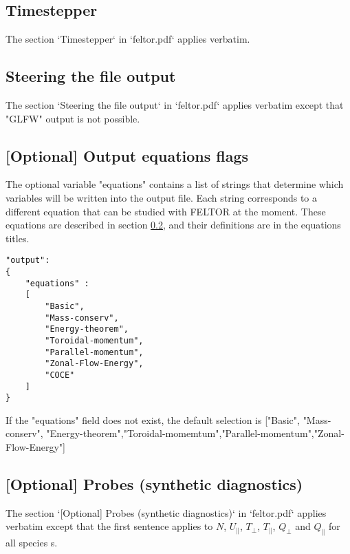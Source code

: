\subsection{Timestepper}
The section `Timestepper` in `feltor.pdf` applies verbatim.

\subsection{Steering the file output} \label{sec:output}
The section `Steering the file output` in `feltor.pdf` applies verbatim except
that "GLFW" output is not possible.


\subsection{[Optional] Output equations flags}\label{sec:output_flags}
The optional variable "equations" contains a list of strings that
determine which variables will be written into the output file.
Each string
corresponds to a different equation that can be studied with FELTOR at the
moment. These equations are described in section \ref{sec:output}, and their
definitions are in the equations titles.
\begin{verbatim}
"output":
{
    "equations" :
    [
        "Basic",
        "Mass-conserv",
        "Energy-theorem",
        "Toroidal-momentum",
        "Parallel-momentum",
        "Zonal-Flow-Energy",
        "COCE"
    ]
}
\end{verbatim}
\begin{tcolorbox}[title=Note]
    If the "equations" field does not exist, the default selection is ["Basic", "Mass-conserv", "Energy-theorem","Toroidal-momemtum","Parallel-momentum","Zonal-Flow-Energy"]
\end{tcolorbox}

\subsection{[Optional] Probes (synthetic diagnostics)}
The section `[Optional] Probes (synthetic diagnostics)` in `feltor.pdf` applies verbatim
except that the first sentence applies to $N$, $U_\parallel$, $T_\perp$, $T_\parallel$, $Q_\perp$ and $Q_\parallel$ for all species s.

